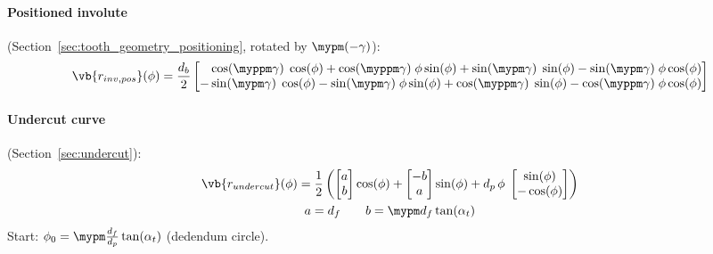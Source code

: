 \paragraph{Positioned involute} (Section~\ref{sec:tooth_geometry_positioning}, rotated by $\mypm(-\gamma)$):
\begin{equation}
    \vb{r_{inv,pos}}(\phi) = \frac{d_b}{2} \begin{bmatrix}
        \phantom{-}\cos(\myppm\gamma)\;\cos(\phi) + \cos(\myppm\gamma)\;\phi\sin(\phi)
                 + \sin(\mypm \gamma)\;\sin(\phi) - \sin(\mypm \gamma)\;\phi\cos(\phi) \\
                 - \sin(\mypm \gamma)\;\cos(\phi) - \sin(\mypm \gamma)\;\phi\sin(\phi)
                 + \cos(\myppm\gamma)\;\sin(\phi) - \cos(\myppm\gamma)\;\phi\cos(\phi) \\
    \end{bmatrix}
\end{equation}

\paragraph{Undercut curve} (Section~\ref{sec:undercut}):
\begin{equation}
    \begin{gathered}
        \vb{r_{undercut}}(\phi) = \frac{1}{2}\left(
              \begin{bmatrix}  a \\ b \end{bmatrix}\cos(\phi)
            + \begin{bmatrix} -b \\ a \end{bmatrix}\sin(\phi)
            + d_p\,\phi\;\begin{bmatrix} \sin(\phi) \\ -\cos(\phi) \end{bmatrix}
        \right)
    \\
        a = d_f \quad\quad b = \mypm d_f\tan(\alpha_t)
    \end{gathered}
\end{equation}
Start: $\phi_0 = \mypm\frac{d_f}{d_p}\tan(\alpha_t)$ (dedendum circle).

